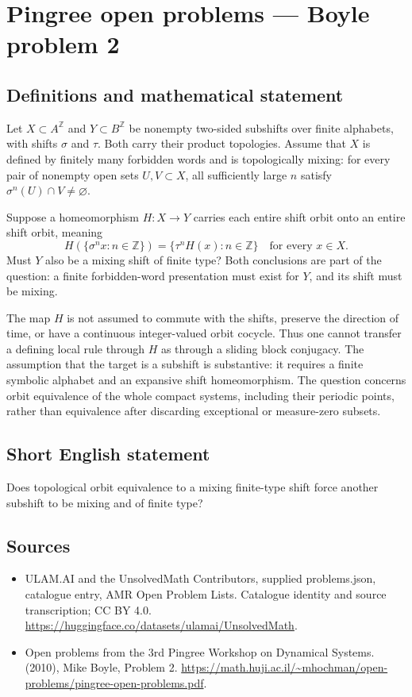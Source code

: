 \documentclass[11pt,a4paper]{article}
\begin{document}
\section*{Pingree open problems — Boyle problem 2}\label{statement}

\subsection{Definitions and mathematical statement}
Let $X\subset A^{\mathbb Z}$ and $Y\subset B^{\mathbb Z}$ be nonempty
two-sided subshifts over finite alphabets, with shifts $\sigma$ and $\tau$.
Both carry their product topologies. Assume that $X$ is defined by finitely
many forbidden words and is topologically mixing: for every pair of nonempty
open sets $U,V\subset X$, all sufficiently large $n$ satisfy
$\sigma^n(U)\cap V\ne\varnothing$.

Suppose a homeomorphism $H:X\to Y$ carries each entire shift orbit onto an
entire shift orbit, meaning
\[
 H(\{\sigma^n x:n\in\mathbb Z\})
       =\{\tau^n H(x):n\in\mathbb Z\}\quad\text{for every }x\in X.
\]
Must $Y$ also be a mixing shift of finite type? Both conclusions are part of
the question: a finite forbidden-word presentation must exist for $Y$, and
its shift must be mixing.

The map $H$ is not assumed to commute with the shifts, preserve the direction
of time, or have a continuous integer-valued orbit cocycle. Thus one cannot
transfer a defining local rule through $H$ as through a sliding block
conjugacy. The assumption that the target is a subshift is substantive: it
requires a finite symbolic alphabet and an expansive shift homeomorphism.
The question concerns orbit equivalence of the whole compact systems,
including their periodic points, rather than equivalence after discarding
exceptional or measure-zero subsets.
\subsection{Short English statement}
Does topological orbit equivalence to a mixing finite-type shift force another subshift to be mixing and of finite type?
\subsection{Sources}
\begin{itemize}
\item[S1] ULAM.AI and the UnsolvedMath Contributors, supplied problems.json, catalogue entry, AMR Open Problem Lists. Catalogue identity and source transcription; CC BY 4.0.
\url{https://huggingface.co/datasets/ulamai/UnsolvedMath}.
\item[S2] Open problems from the 3rd Pingree Workshop on Dynamical Systems. (2010), Mike Boyle, Problem 2. 
\url{https://math.huji.ac.il/~mhochman/open-problems/pingree-open-problems.pdf}.
\end{itemize}
\end{document}
